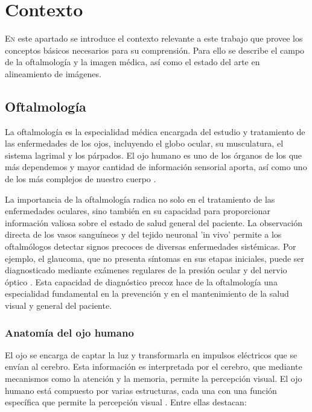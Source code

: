 \chapter{Contexto}
\label{chap:contexto}

\lettrine{E}{n} este apartado se introduce el contexto relevante a este trabajo que provee los conceptos básicos necesarios para su comprensión.
Para ello se describe el campo de la oftalmología y la imagen médica, así como el estado del arte en alineamiento de imágenes.

\section{Oftalmología}
\label{sec:Oftalmoloxía}
La oftalmología es la especialidad médica encargada del estudio y tratamiento de las enfermedades de los ojos, incluyendo el globo ocular, su musculatura, el sistema lagrimal y los párpados.
El ojo humano es uno de los órganos de los que más dependemos y mayor cantidad de información sensorial aporta, así como uno de los más complejos de nuestro cuerpo \cite{kanski2011clinical}.

La importancia de la oftalmología radica no solo en el tratamiento de las enfermedades oculares, sino también en su capacidad para proporcionar información valiosa sobre el estado de salud general del paciente.
La observación directa de los vasos sanguíneos y del tejido neuronal 'in vivo' permite a los oftalmólogos detectar signos precoces de diversas enfermedades sistémicas.
Por ejemplo, el glaucoma, que no presenta síntomas en sus etapas iniciales, puede ser diagnosticado mediante exámenes regulares de la presión ocular y del nervio óptico \cite{importglaucoma}.
Esta capacidad de diagnóstico precoz hace de la oftalmología una especialidad fundamental en la prevención y en el mantenimiento de la salud visual y general del paciente.

\subsection{Anatomía del ojo humano}
\label{subsec:Anatomía do ollo humano}
El ojo se encarga de captar la luz y transformarla en impulsos eléctricos que se envían al cerebro.
Esta información es interpretada por el cerebro, que mediante mecanismos como la atención y la memoria, permite la percepción visual. \cite{eyefunct}
El ojo humano está compuesto por varias estructuras, cada una con una función específica que permite la percepción visual \cite{eyeanat}. Entre ellas destacan:

